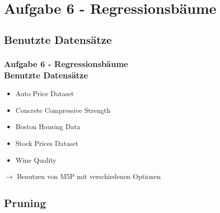 \documentclass[accentcolor=tud6b,colorbacktitle,inverttitle,landscape,german,presentation,t]{tudbeamer}
\begin{document}
    \section{Aufgabe 6 - Regressionsbäume}
    
    \subsection{Benutzte Datensätze}
    
    \begin{frame}[t]
    \frametitle{Aufgabe 6 - Regressionsbäume\\ Benutzte Datensätze}
        \begin{itemize}
            \item Auto Price Dataset
            \item Concrete Compressive Strength
            \item Boston Housing Data
            \item Stock Prices Dataset
            \item Wine Quality
        \end{itemize}
        \vfill
        $\rightarrow$ Benutzen von M5P mit verschiedenen Optionen
    \end{frame}
    
    \subsection{Pruning}
    
\end{document}
